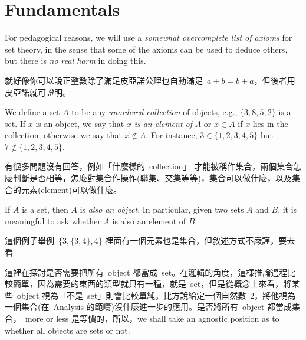 \section{Fundamentals}\label{sec 3.1}

For pedagogical reasons, we will use a \emph{somewhat overcomplete list of axioms} for set theory, in the sense that some of the axioms can be used to deduce others, but there is \emph{no real harm} in doing this.

\begin{note}
就好像你可以說正整數除了滿足皮亞諾公理也自動滿足\ \(a + b = b + a\)，但後者用皮亞諾就可證明。
\end{note}

\begin{definition} \label{def 3.1.1}
We define a set \(A\) to be any \emph{unordered collection} of objects, e.g., \( \{3, 8, 5, 2\} \) is a set. If \(x\) is an object, we say that \(x\) \emph{is an element of} \(A\) or \(x \in A\) if \(x\) lies in the collection; otherwise we say that \(x \notin A\). For instance, \(3 \in \{1, 2, 3, 4, 5\} \) but \(7 \notin \{1, 2, 3, 4, 5\} \).
\end{definition}

\begin{note}
 有很多問題沒有回答，例如「什麼樣的\ collection」 才能被稱作集合，兩個集合怎麼判斷是否相等，怎麼對集合作操作(聯集、交集等等)，集合可以做什麼，以及集合的元素(element)可以做什麼。
\end{note}

\begin{axiom}\label{axm 3.1}
If \(A\) is a set, then \(A\) is \emph{also an object}. In particular, given two sets \(A\) and \(B\), it is meaningful to ask whether \(A\) is also an element of \(B\).
\end{axiom}

\begin{example}[Informal]\label{example 3.1.2}
這個例子舉例\ \( \{3, \{3, 4\}, 4\} \) 裡面有一個元素也是集合，但敘述方式不嚴謹，要去看\ 
\end{example}

\begin{remark}\label{remark 3.1.3}
這裡在探討是否需要把所有\ object 都當成\  set。在邏輯的角度，這樣推論過程比較簡單，因為需要的東西的類型就只有一種，就是\ set，但是從概念上來看，將某些\ object 視為「不是\ set」則會比較單純，比方說給定一個自然數\ \(2\)，將他視為一個集合(在\ Analysis 的範疇)沒什麼進一步的應用。是否將所有\ object 都當成集合，\ more or less 是等價的，所以，we shall take an agnostic position as to whether all objects are sets or not.
\end{remark}

